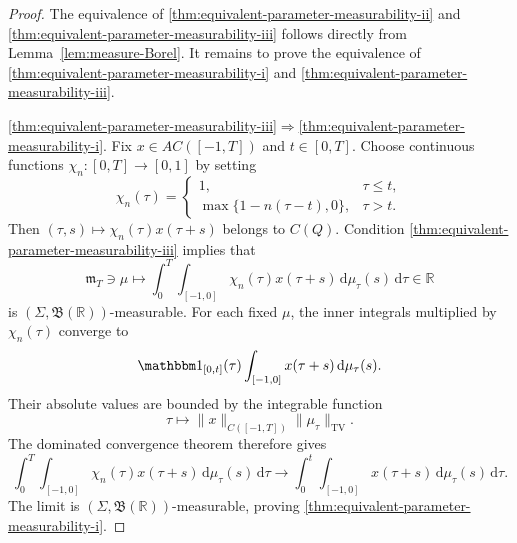 \documentclass[10pt,a4paper]{amsart}
\newcommand\RR{\ensuremath{\mathbb{R}}}
\newcommand{\dd}{\ensuremath{\mathrm{d}}}
\begin{document}
\begin{proof}
The equivalence of \ref{thm:equivalent-parameter-measurability-ii} and \ref{thm:equivalent-parameter-measurability-iii} follows directly
from Lemma~\ref{lem:measure-Borel}.
It remains to prove the equivalence of \ref{thm:equivalent-parameter-measurability-i} and \ref{thm:equivalent-parameter-measurability-iii}.

\medskip
\noindent
\ref{thm:equivalent-parameter-measurability-iii}$\Rightarrow$\ref{thm:equivalent-parameter-measurability-i}.
Fix $x\in AC([-1,T])$ and $t\in[0,T]$.
Choose continuous functions $\chi_n:[0,T]\to[0,1]$
by setting
\begin{equation*}
    \chi_n(\tau)
    =
    \begin{cases}
        1,&\tau\le t,\\
        \max\{1-n(\tau-t),0\},&\tau>t.
    \end{cases}
\end{equation*}
Then $(\tau,s)\mapsto\chi_n(\tau)x(\tau+s)$ belongs to $C(Q)$. Condition \ref{thm:equivalent-parameter-measurability-iii} implies that
\begin{equation*}
    \mathfrak{m}_T\ni \mu\mapsto
    \int_0^T\int_{[-1,0]}
    \chi_n(\tau)x(\tau+s)\,
    \dd\mu_\tau(s)\,\dd\tau \in \RR
\end{equation*}
is $(\Sigma,\mathfrak B(\mathbb R))$-measurable. For each fixed $\mu$, the inner integrals multiplied
by $\chi_n(\tau)$ converge to
\begin{equation*}
    \mathbbm 1_{[0,t]}(\tau)
    \int_{[-1,0]}x(\tau+s)\,\dd\mu_\tau(s).
\end{equation*}
Their absolute values are bounded by the integrable
function
\begin{equation*}
    \tau\mapsto \|x\|_{C([-1,T])}\|\mu_\tau\|_{\mathrm{TV}}. 
\end{equation*}
The dominated convergence theorem therefore gives
\begin{equation*}
    \int_0^T\int_{[-1,0]}
    \chi_n(\tau)x(\tau+s)\,
    \dd\mu_\tau(s)\,\dd\tau
    \to
    \int_0^t\int_{[-1,0]}
    x(\tau+s)\,\dd\mu_\tau(s)\,\dd\tau.
\end{equation*}
The limit is $(\Sigma,\mathfrak B(\mathbb R))$-measurable, proving \ref{thm:equivalent-parameter-measurability-i}.


\end{proof}
\end{document}
